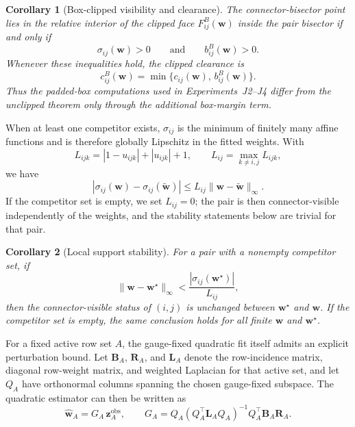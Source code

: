\documentclass[preprint,12pt]{elsarticle}
\newtheorem{corollary}{Corollary}
\newcommand{\weights}{\mathbf{w}}
\newcommand{\inc}{\mathbf{B}}
\newcommand{\lap}{\mathbf{L}}
\begin{document}
\begin{corollary}[Box-clipped visibility and clearance]
\label{cor:box_clipped_visibility}
The connector-bisector point lies in the relative interior of the clipped face
$F_{ij}^B(\weights)$ inside the pair bisector if and only if
\begin{equation}
    \sigma_{ij}(\weights)>0
    \qquad\text{and}\qquad
    b_{ij}^B(\weights)>0.
\end{equation}
Whenever these inequalities hold, the clipped clearance is
\begin{equation}
    c_{ij}^B(\weights)=\min\{c_{ij}(\weights),\,b_{ij}^B(\weights)\}.
\end{equation}
Thus the padded-box computations used in Experiments~J2--J4 differ from the
unclipped theorem only through the additional box-margin term.
\end{corollary}

When at least one competitor exists, $\sigma_{ij}$ is the minimum of finitely
many affine functions and is therefore globally Lipschitz in the fitted weights.
With
\begin{equation}
    L_{ijk}=|1-u_{ijk}|+|u_{ijk}|+1,
    \qquad
    L_{ij}=\max_{k\neq i,j}L_{ijk},
\end{equation}
we have
\begin{equation}
    |\sigma_{ij}(\weights)-\sigma_{ij}(\widetilde{\weights})|
    \le L_{ij}\lVert \weights-\widetilde{\weights}\rVert_\infty.
\end{equation}
If the competitor set is empty, we set $L_{ij}=0$; the pair is then
connector-visible independently of the weights, and the stability statements
below are trivial for that pair.

\begin{corollary}[Local support stability]
\label{cor:visibility_stability_main}
For a pair with a nonempty competitor set, if
\begin{equation}
    \lVert \weights-\weights^\star\rVert_\infty
    < \frac{|\sigma_{ij}(\weights^\star)|}{L_{ij}},
\end{equation}
then the connector-visible status of $(i,j)$ is unchanged between
$\weights^\star$ and $\weights$. If the competitor set is empty, the same
conclusion holds for all finite $\weights$ and $\weights^\star$.
\end{corollary}

For a fixed active row set $A$, the gauge-fixed quadratic fit itself admits an
explicit perturbation bound. Let $\inc_A$, $\mathbf{R}_A$, and $\lap_A$ denote
the row-incidence matrix, diagonal row-weight matrix, and weighted Laplacian
for that active set, and let $Q_A$ have orthonormal columns spanning the chosen
gauge-fixed subspace. The quadratic estimator can then be written as
\begin{equation}
    \widehat{\weights}_A = G_A\,\mathbf{z}^{\mathrm{obs}}_A,
    \qquad
    G_A = Q_A(Q_A^\top \lap_A Q_A)^{-1}Q_A^\top \inc_A\mathbf{R}_A.
\end{equation}
\end{document}
